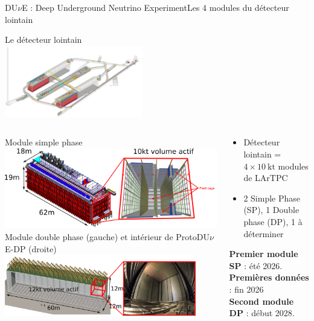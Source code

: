     \begin{frame}{DU$\nu$E : Deep Underground Neutrino Experiment}{Les 4 modules du détecteur lointain}
        \begin{scriptsize}
            \centering Le détecteur lointain\\
            \includegraphics[width=0.45\textwidth]{./pictures/FD.png}\\
            \begin{columns}
                \begin{column}{0.55\textwidth}
                    \centering Module simple phase\\
                    \includegraphics[width=\textwidth]{./pictures/module_SP.png}\\
                    \centering Module double phase (gauche) et intérieur de ProtoDU$\nu$E-DP (droite)\\
                    \includegraphics[width=0.9\textwidth]{./pictures/module_DP.png}
                \end{column}
                \begin{column}{0.45\textwidth}
                    \begin{itemize}
                        \item Détecteur lointain = $4\times\SI{10}{\kilo\tonne}$ modules de LArTPC
                        \item 2 Simple Phase (SP), 1 Double phase (DP), 1 à déterminer
                    \end{itemize}\vspace{0.4cm}
                    \textbf{Premier module SP} : été 2026.\\
                    \textbf{Premières données} : fin 2026\\
                    \textbf{Second module DP} : début 2028.\\\vspace{0.4cm}


\end{column}
\end{columns}
\end{scriptsize}
\end{frame}

